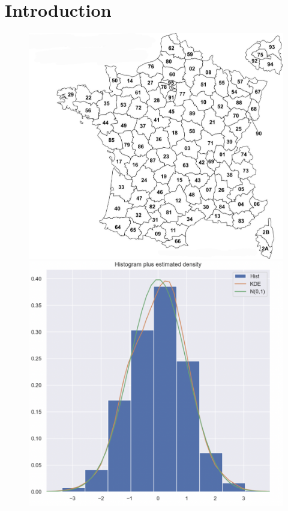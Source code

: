 
\section{Introduction}
\begin{frame}
\begin{figure}[h!]
	\begin{minipage}[b]{0.01\linewidth}
	  \includegraphics[scale=0.1]{images/Image (1)-1.jpg}
	\end{minipage}\hfill
	\begin{minipage}[b]{0.4\linewidth}	
		\centering \includegraphics[scale=0.3]{images/histogramme.png}
	\end{minipage}
\end{figure}
\end{frame}
